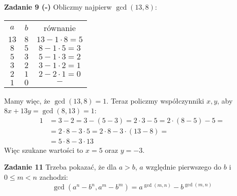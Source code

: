\documentclass[a4paper,12pt]{article}
\begin{document}
\noindent \textbf{Zadanie 9 (-)} \newline
Obliczmy najpierw $\gcd(13,8)$:
\begin{center}
\begin{tabular}{ c c c }
$a$ 	& $b$		& równanie \\
$13$ 	& $8$		& $13 - 1\cdot 8 = 5$ \\
$8$	& $5$		& $8 - 1\cdot 5  = 3$ \\
$5$	& $3$		& $5 - 1\cdot 3  = 2$ \\
$3$	& $2$		& $3 - 1\cdot 2  = 1$ \\
$2$	& $1$		& $2 - 2\cdot 1  = 0$ \\
$1$	& $0$		&  $-$
\end{tabular}
\end{center}
Mamy więc, że $\gcd(13,8) = 1$. Teraz policzmy współczynniki $x, y$, aby $8x + 13y = \gcd(8,13) = 1$:
$$ 
\begin{aligned}
1 &= 3 - 2 = 3 - (5 - 3) = 2\cdot 3 - 5 = 2\cdot (8-5) - 5 = \\
  &= 2\cdot 8 - 3\cdot 5 = 2\cdot 8 - 3\cdot (13-8) = \\
  &= 5\cdot 8 - 3\cdot 13
\end{aligned}
$$
\noindent Więc szukane wartości to $x = 5$ oraz $y = -3$.

\newpage
\noindent \textbf{Zadanie 11} \newline
Trzeba pokazać, że dla $a>b$, $a$ względnie pierwszego do $b$ i $0 \leq m < n$ zachodzi:
$$\gcd(a^n - b^n, a^m - b^m) = a^{\gcd(m, n)} - b^{\gcd(m, n)}$$
\end{document}

